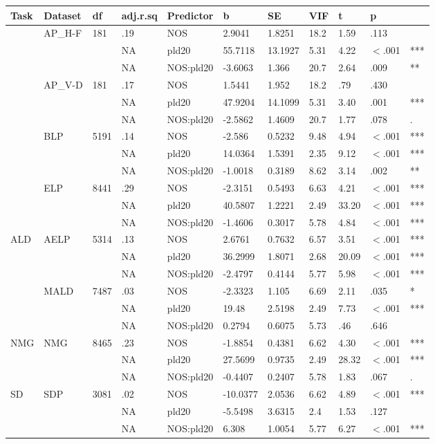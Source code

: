 \begin{table}[ht]
\centering
\begingroup\normalsize
\begin{tabular}{lllllllllll}
  \hline
Task & Dataset & df & adj.r.sq & Predictor & b & SE & VIF & t & p &  \\ 
  \hline
 & AP\_H-F & 181 & .19 & NOS & 2.9041 & 1.8251 & 18.2 & 1.59 & .113 &   \\ 
   &  &  & NA & pld20 & 55.7118 & 13.1927 & 5.31 & 4.22 & $<$.001 & *** \\ 
   &  &  & NA & NOS:pld20 & -3.6063 & 1.366 & 20.7 & 2.64 & .009 & ** \\ 
   & AP\_V-D & 181 & .17 & NOS & 1.5441 & 1.952 & 18.2 & .79 & .430 &   \\ 
   &  &  & NA & pld20 & 47.9204 & 14.1099 & 5.31 & 3.40 & .001 & *** \\ 
   &  &  & NA & NOS:pld20 & -2.5862 & 1.4609 & 20.7 & 1.77 & .078 & . \\ 
   & BLP & 5191 & .14 & NOS & -2.586 & 0.5232 & 9.48 & 4.94 & $<$.001 & *** \\ 
   &  &  & NA & pld20 & 14.0364 & 1.5391 & 2.35 & 9.12 & $<$.001 & *** \\ 
   &  &  & NA & NOS:pld20 & -1.0018 & 0.3189 & 8.62 & 3.14 & .002 & ** \\ 
   & ELP & 8441 & .29 & NOS & -2.3151 & 0.5493 & 6.63 & 4.21 & $<$.001 & *** \\ 
   &  &  & NA & pld20 & 40.5807 & 1.2221 & 2.49 & 33.20 & $<$.001 & *** \\ 
   &  &  & NA & NOS:pld20 & -1.4606 & 0.3017 & 5.78 & 4.84 & $<$.001 & *** \\ 
  ALD & AELP & 5314 & .13 & NOS & 2.6761 & 0.7632 & 6.57 & 3.51 & $<$.001 & *** \\ 
   &  &  & NA & pld20 & 36.2999 & 1.8071 & 2.68 & 20.09 & $<$.001 & *** \\ 
   &  &  & NA & NOS:pld20 & -2.4797 & 0.4144 & 5.77 & 5.98 & $<$.001 & *** \\ 
   & MALD & 7487 & .03 & NOS & -2.3323 & 1.105 & 6.69 & 2.11 & .035 & * \\ 
   &  &  & NA & pld20 & 19.48 & 2.5198 & 2.49 & 7.73 & $<$.001 & *** \\ 
   &  &  & NA & NOS:pld20 & 0.2794 & 0.6075 & 5.73 & .46 & .646 &   \\ 
  NMG & NMG & 8465 & .23 & NOS & -1.8854 & 0.4381 & 6.62 & 4.30 & $<$.001 & *** \\ 
   &  &  & NA & pld20 & 27.5699 & 0.9735 & 2.49 & 28.32 & $<$.001 & *** \\ 
   &  &  & NA & NOS:pld20 & -0.4407 & 0.2407 & 5.78 & 1.83 & .067 & . \\ 
  SD & SDP & 3081 & .02 & NOS & -10.0377 & 2.0536 & 6.62 & 4.89 & $<$.001 & *** \\ 
   &  &  & NA & pld20 & -5.5498 & 3.6315 & 2.4 & 1.53 & .127 &   \\ 
   &  &  & NA & NOS:pld20 & 6.308 & 1.0054 & 5.77 & 6.27 & $<$.001 & *** \\ 
   \hline
\end{tabular}
\endgroup
\end{table}
